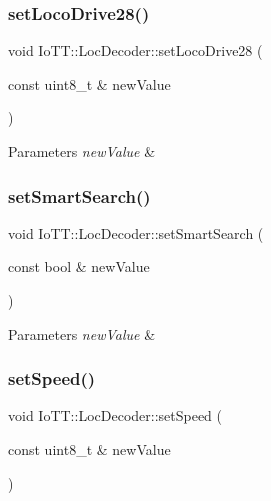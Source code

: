\subsubsection{\texorpdfstring{set\+Loco\+Drive28()}{setLocoDrive28()}}
{\footnotesize\ttfamily void Io\+T\+T\+::\+Loc\+Decoder\+::set\+Loco\+Drive28 (\begin{DoxyParamCaption}\item[{const uint8\+\_\+t \&}]{new\+Value }\end{DoxyParamCaption})}


\begin{DoxyParams}{Parameters}
{\em new\+Value} & \\
\hline
\end{DoxyParams}
\mbox{\label{classIoTT_1_1LocDecoder_acdda1c9b2f6f792bc1a3d246e12d3aeb}} 
\subsubsection{\texorpdfstring{set\+Smart\+Search()}{setSmartSearch()}}
{\footnotesize\ttfamily void Io\+T\+T\+::\+Loc\+Decoder\+::set\+Smart\+Search (\begin{DoxyParamCaption}\item[{const bool \&}]{new\+Value }\end{DoxyParamCaption})}


\begin{DoxyParams}{Parameters}
{\em new\+Value} & \\
\hline
\end{DoxyParams}
\mbox{\label{classIoTT_1_1LocDecoder_a9ac45335c62250e8f64086e0a06f399a}} 
\subsubsection{\texorpdfstring{set\+Speed()}{setSpeed()}}
{\footnotesize\ttfamily void Io\+T\+T\+::\+Loc\+Decoder\+::set\+Speed (\begin{DoxyParamCaption}\item[{const uint8\+\_\+t \&}]{new\+Value }\end{DoxyParamCaption})}


